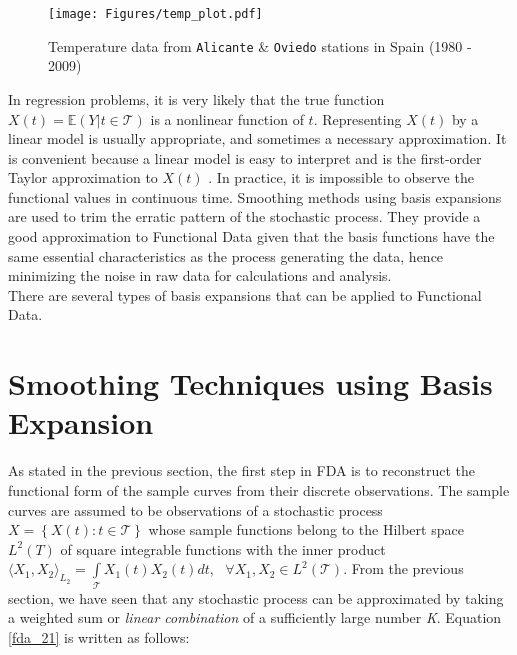 \begin{figure}[h]
  \centering
    \texttt{[image: Figures/temp\_plot.pdf]}
  \caption[Temperature data from \texttt{Alicante} \& \texttt{Oviedo}]{Temperature data from \texttt{Alicante} \& \texttt{Oviedo} stations in Spain (1980 - 2009)}
  \label{fig:FDA1}
\end{figure} 
 In regression problems, it is very likely that the true function $X(t) = \mathbb{E}(Y|t \in \mathcal{T})$ is a nonlinear function of $t$. Representing $X(t)$ by a linear model is usually appropriate, and sometimes a necessary approximation. It is convenient because a linear model is easy to interpret and is the first-order Taylor approximation to $X(t)$ \citep*{hastie_09_elements-of.statistical-learning}. In practice, it is impossible to observe the functional values in continuous time. Smoothing methods using basis expansions are used to trim the erratic pattern of the stochastic process. They provide a good approximation to Functional Data given that the basis functions have the same essential characteristics as the process generating the data, hence minimizing the noise in raw data for calculations and analysis.\\ 
There are several types of basis expansions that can be applied to Functional Data.
\clearpage

\section{Smoothing Techniques using Basis Expansion}\label{basis_expansion}

As stated in the previous section, the first step in FDA is to reconstruct the functional form of the sample curves from their discrete observations. The sample curves are assumed to be observations of a stochastic process $X = \left\lbrace X(t):t \in \mathcal{T} \right\rbrace$ whose sample functions belong to the Hilbert space $L^{2}(T)$ of square integrable functions with the inner product $\langle X_{1},X_{2} \rangle_{L_{2}} = \int\limits_{\mathcal{T}}X_{1}(t)X_{2}(t)dt,\text{ } \forall X_{1},X_{2} \in L^{2}(\mathcal{T})$. From the previous section, we have seen that any stochastic process can be approximated by taking a weighted sum or \textit{linear combination} of a sufficiently large number \textit{K}. Equation \eqref{fda_21} is written as follows:

